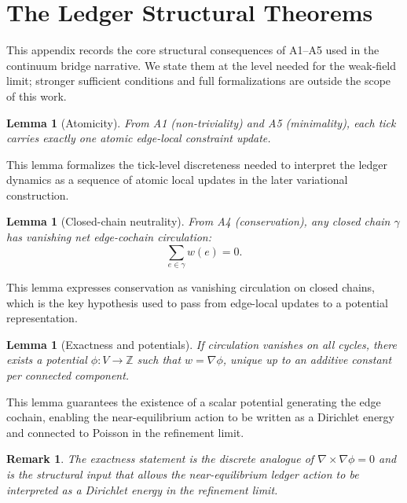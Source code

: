 \documentclass[entropy,article,submit,pdftex,moreauthors]{Definitions/mdpi}
\newcommand{\ZZ}{\mathbb{Z}}
\newtheorem{lemmaX}[theoremX]{Lemma}
\newtheorem{remarkX}[theoremX]{Remark}
\begin{document}
\section[\appendixname~\thesection]{The Ledger Structural Theorems}
\label{app:ledger-theorems}

This appendix records the core structural consequences of A1--A5 used in the continuum bridge narrative.
We state them at the level needed for the weak-field limit; stronger sufficient conditions and full formalizations are outside the scope of this work.

\begin{lemmaX}[Atomicity]
\label{thm:atomicity}
From A1 (non-triviality) and A5 (minimality), each tick carries exactly one atomic edge-local constraint update.
\end{lemmaX}
This lemma formalizes the tick-level discreteness needed to interpret the ledger dynamics as a sequence of atomic local updates in the later variational construction.

\begin{lemmaX}[Closed-chain neutrality]
\label{thm:neutrality}
From A4 (conservation), any closed chain \(\gamma\) has vanishing net edge-cochain circulation:
\begin{equation}
  \sum_{e\in\gamma} w(e)=0.
\end{equation}
\end{lemmaX}
This lemma expresses conservation as vanishing circulation on closed chains, which is the key hypothesis used to pass from edge-local updates to a potential representation.

\begin{lemmaX}[Exactness and potentials]
\label{thm:exactness}
If circulation vanishes on all cycles, there exists a potential \(\phi:V\to\ZZ\) such that \(w=\nabla\phi\), unique up to an additive constant per connected component.
\end{lemmaX}
This lemma guarantees the existence of a scalar potential generating the edge cochain, enabling the near-equilibrium action to be written as a Dirichlet energy and connected to Poisson in the refinement limit.

\begin{remarkX}
The exactness statement is the discrete analogue of \(\nabla\times\nabla\phi=0\) and is the structural input that allows the near-equilibrium ledger action to be interpreted as a Dirichlet energy in the refinement limit.
\end{remarkX}
\end{document}
